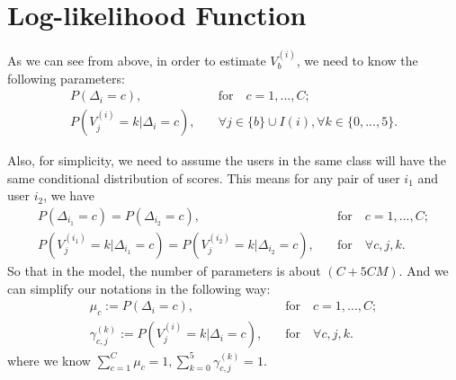 \documentclass[a4paper,10pt]{article}
\begin{document}
\section{Log-likelihood Function}
As we can see from above, in order to estimate $V_b^{(i)}$, we need to know the following parameters:
\begin{equation}
\begin{split}
P(\Delta_i = c), \quad &\text{for} \quad c = 1, ..., C; \\
P(V_j^{(i)} = k | \Delta_i = c), \quad&\forall j \in \{b\} \cup I(i), \forall k \in \{0, ..., 5\}.
\end{split}	
\end{equation}

Also, for simplicity, we need to assume the users in the same class will have the same conditional distribution of scores. This means for any pair of user $i_1$ and user $i_2$, we have
\begin{equation}
\begin{split}
P(\Delta_{i_1} = c) = P(\Delta_{i_2} = c), \quad &\text{for} \quad c = 1, ..., C; \\
P(V_j^{(i_1)} = k | \Delta_{i_1} = c) = P(V_j^{(i_2)} = k | \Delta_{i_2} = c), \quad&\text{for} \quad \forall c, j, k.
\end{split}
\end{equation}
So that in the model, the number of parameters is about $(C + 5CM)$. And we can simplify our notations in the following way:
\begin{equation}
\begin{split}
\mu_c := P(\Delta_{i} = c), \quad &\text{for} \quad c = 1, ..., C; \\
\gamma_{c, j}^{(k)} := P(V_j^{(i)} = k | \Delta_{i} = c), \quad&\text{for}  \quad \forall c, j, k.
\end{split}
\end{equation}
where we know $\sum_{c = 1}^{C} \mu_c = 1, \sum_{k = 0}^{5}\gamma_{c, j}^{(k)} = 1$.
\end{document}
